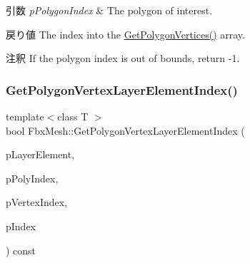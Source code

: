 \begin{DoxyParams}{引数}
{\em p\+Polygon\+Index} & The polygon of interest. \\
\hline
\end{DoxyParams}
\begin{DoxyReturn}{戻り値}
The index into the \hyperlink{class_fbx_mesh_a0c29a17dfc1db3644772acb5c32a63b0}{Get\+Polygon\+Vertices()} array. 
\end{DoxyReturn}
\begin{DoxyRemark}{注釈}
If the polygon index is out of bounds, return -\/1. 
\end{DoxyRemark}
\mbox{\label{class_fbx_mesh_a68a6816acf0eaacc995144b14a28c856}} 
\subsubsection{\texorpdfstring{Get\+Polygon\+Vertex\+Layer\+Element\+Index()}{GetPolygonVertexLayerElementIndex()}}
{\footnotesize\ttfamily template$<$class T $>$ \\
bool Fbx\+Mesh\+::\+Get\+Polygon\+Vertex\+Layer\+Element\+Index (\begin{DoxyParamCaption}\item[{const \hyperlink{class_fbx_layer_element_template}{Fbx\+Layer\+Element\+Template}$<$ T $>$ $\ast$}]{p\+Layer\+Element,  }\item[{int}]{p\+Poly\+Index,  }\item[{int}]{p\+Vertex\+Index,  }\item[{int \&}]{p\+Index }\end{DoxyParamCaption}) const\hspace{0.3cm}{\ttfamily [protected]}}

\mbox{\label{class_fbx_mesh_aaa40241afa27d42fbacb6d78f00a947b}} 

